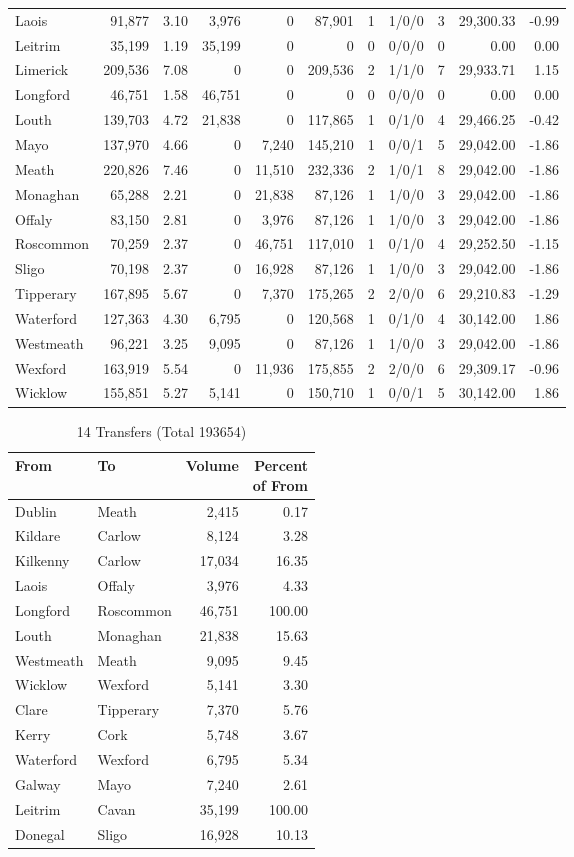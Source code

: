 \documentclass[a4paper]{article}
\begin{document}
\begin{longtable}{lrrrrrrlrrr}
Laois&91,877& 3.10&3,976&0&87,901&1&1/0/0&3&29,300.33&-0.99\\ 
Leitrim&35,199& 1.19&35,199&0&0&0&0/0/0&0& 0.00& 0.00\\ 
Limerick&209,536& 7.08&0&0&209,536&2&1/1/0&7&29,933.71& 1.15\\ 
Longford&46,751& 1.58&46,751&0&0&0&0/0/0&0& 0.00& 0.00\\ 
Louth&139,703& 4.72&21,838&0&117,865&1&0/1/0&4&29,466.25&-0.42\\ 
Mayo&137,970& 4.66&0&7,240&145,210&1&0/0/1&5&29,042.00&-1.86\\ 
Meath&220,826& 7.46&0&11,510&232,336&2&1/0/1&8&29,042.00&-1.86\\ 
Monaghan&65,288& 2.21&0&21,838&87,126&1&1/0/0&3&29,042.00&-1.86\\ 
Offaly&83,150& 2.81&0&3,976&87,126&1&1/0/0&3&29,042.00&-1.86\\ 
Roscommon&70,259& 2.37&0&46,751&117,010&1&0/1/0&4&29,252.50&-1.15\\ 
Sligo&70,198& 2.37&0&16,928&87,126&1&1/0/0&3&29,042.00&-1.86\\ 
Tipperary&167,895& 5.67&0&7,370&175,265&2&2/0/0&6&29,210.83&-1.29\\ 
Waterford&127,363& 4.30&6,795&0&120,568&1&0/1/0&4&30,142.00& 1.86\\ 
Westmeath&96,221& 3.25&9,095&0&87,126&1&1/0/0&3&29,042.00&-1.86\\ 
Wexford&163,919& 5.54&0&11,936&175,855&2&2/0/0&6&29,309.17&-0.96\\ 
Wicklow&155,851& 5.27&5,141&0&150,710&1&0/0/1&5&30,142.00& 1.86\\ 
\end{longtable}

\begin{table}[htbp]
\caption{14 Transfers (Total 193654)}
\centering
\begin{tabular}{llrr} \toprule
From &To &Volume &\shortstack{Percent\\of From} \\ \midrule
Dublin&Meath&2,415& 0.17\\ 
Kildare&Carlow&8,124& 3.28\\ 
Kilkenny&Carlow&17,034&16.35\\ 
Laois&Offaly&3,976& 4.33\\ 
Longford&Roscommon&46,751&100.00\\ 
Louth&Monaghan&21,838&15.63\\ 
Westmeath&Meath&9,095& 9.45\\ 
Wicklow&Wexford&5,141& 3.30\\ 
Clare&Tipperary&7,370& 5.76\\ 
Kerry&Cork&5,748& 3.67\\ 
Waterford&Wexford&6,795& 5.34\\ 
Galway&Mayo&7,240& 2.61\\ 
Leitrim&Cavan&35,199&100.00\\ 
Donegal&Sligo&16,928&10.13\\ 
\bottomrule
\end{tabular}
\end{table}
\end{document}
